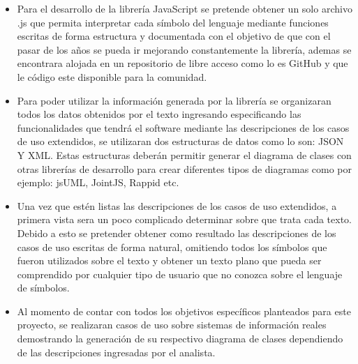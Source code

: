\documentclass[12pt,a4paper,final]{article}
\begin{document}
	\begin{itemize}
		
		\item Para el desarrollo de la librería JavaScript se pretende obtener un solo archivo .js que permita interpretar cada símbolo del lenguaje mediante funciones escritas de forma estructura y documentada con el objetivo de que con el pasar de los años se pueda ir mejorando constantemente la librería, ademas se encontrara alojada en un repositorio de libre acceso como lo es GitHub y que le código este disponible para la comunidad. 
		
		\item Para poder utilizar la información generada por la librería se organizaran todos los datos obtenidos por el texto ingresando especificando las funcionalidades que tendrá el software mediante las descripciones de los casos de uso extendidos, se utilizaran dos estructuras de datos como lo son: JSON Y XML. Estas estructuras deberán permitir generar el diagrama de clases con otras librerías de desarrollo para crear diferentes tipos de diagramas como por ejemplo: jsUML, JointJS, Rappid etc. 
		
		\item Una vez que estén listas las descripciones de los casos de uso extendidos, a primera vista sera un poco complicado determinar sobre que trata cada texto. Debido a esto se pretender obtener como resultado las descripciones de los casos de uso escritas de forma natural, omitiendo todos los símbolos que fueron utilizados sobre el texto y obtener un texto plano que pueda ser comprendido por cualquier tipo de usuario que no conozca sobre el lenguaje de símbolos. 
		 
		
		\item Al momento de contar con todos los objetivos específicos planteados para este proyecto, se realizaran casos de uso sobre sistemas de información reales demostrando la generación de su respectivo diagrama de clases dependiendo de las descripciones ingresadas por el analista. 
		
	\end{itemize}
	
	\printbibliography[title={\thesection. BIBLIOGRAFÍA}]

	
\end{document}
